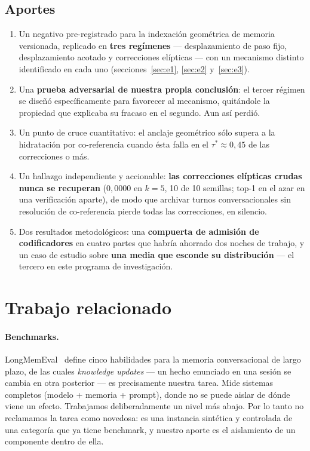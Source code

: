 \documentclass[11pt,a4paper]{article}
\begin{document}
\subsection{Aportes}

\begin{enumerate}
\item Un negativo pre-registrado para la indexación geométrica de memoria versionada, replicado en
      \textbf{tres regímenes} --- desplazamiento de paso fijo, desplazamiento acotado y correcciones
      elípticas --- con un mecanismo distinto identificado en cada uno (secciones~\ref{sec:e1},
      \ref{sec:e2} y~\ref{sec:e3}).
\item Una \textbf{prueba adversarial de nuestra propia conclusión}: el tercer régimen se diseñó
      específicamente para favorecer al mecanismo, quitándole la propiedad que explicaba su fracaso
      en el segundo. Aun así perdió.
\item Un punto de cruce cuantitativo: el anclaje geométrico sólo supera a la hidratación por
      co-referencia cuando ésta falla en el $\tau^{*} \approx 0{,}45$ de las correcciones o más.
\item Un hallazgo independiente y accionable: \textbf{las correcciones elípticas crudas nunca se
      recuperan} ($0{,}0000$ en $k=5$, 10 de 10 semillas; top-1 en el azar en una verificación
      aparte), de modo que archivar turnos conversacionales sin resolución de co-referencia pierde
      todas las correcciones, en silencio.
\item Dos resultados metodológicos: una \textbf{compuerta de admisión de codificadores} en cuatro
      partes que habría ahorrado dos noches de trabajo, y un caso de estudio sobre \textbf{una media
      que esconde su distribución} --- el tercero en este programa de investigación.
\end{enumerate}

\section{Trabajo relacionado}

\paragraph{Benchmarks.} LongMemEval~\cite{longmemeval} define cinco habilidades para la memoria
conversacional de largo plazo, de las cuales \emph{knowledge updates} --- un hecho enunciado en una
sesión se cambia en otra posterior --- es precisamente nuestra tarea. Mide sistemas completos (modelo
+ memoria + prompt), donde no se puede aislar de dónde viene un efecto. Trabajamos deliberadamente un
nivel más abajo. Por lo tanto no reclamamos la tarea como novedosa: es una instancia sintética y
controlada de una categoría que ya tiene benchmark, y nuestro aporte es el aislamiento de un
componente dentro de ella.
\end{document}
